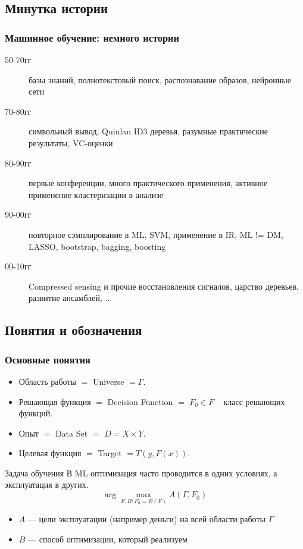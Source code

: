 \documentclass[14pt, fleqn, xcolor={dvipsnames, table}]{beamer}
\begin{document}
\subsection{Минутка истории}
\begin{frame}
\frametitle{Машинное обучение: немного истории}
\begin{small}
\begin{description}
	\item[50-70гг] базы знаний, полнотекстовый поиск, распознавание образов, нейронные сети
	\item[70-80гг] символьный вывод, Quinlan ID3 деревья, разумные практические результаты, VC-оценки
	\item[80-90гг] первые конференции, много практического применения, активное применение кластеризации в анализе
	\item[90-00гг] повторное сэмплирование в ML, SVM, применение в IR, ML != DM, LASSO, bootstrap, bagging, boosting
	\item[00-10гг] Compressed sensing и прочие восстановления сигналов, царство деревьев, развитие ансамблей, $\ldots$
\end{description}
\end{small}
\end{frame}

\subsection{Понятия и обозначения}
\begin{frame}
\frametitle{Основные понятия}
\begin{itemize}
	\item Область работы $=$ Universe $=\Gamma$.
	\item Решающая функция $=$ Decision Function $=$ $F_0 \in F$ -- класс решающих функций.
	\item Опыт $=$ Data Set $=$ $D = X \times Y$.
	\item Целевая функция $=$ Target $=T(y,F(x))$.
\end{itemize}
\end{frame}

\begin{frame}{Задача обучения}
В ML оптимизация часто проводится в одних условиях, а эксплуатация в других. 
$$
\arg \max_{F, B: F_0 = B(F)} A(\Gamma, F_0)
$$
\begin{itemize}
	\item $A$ --- цели эксплуатации (например деньги) на всей области работы $\Gamma$
	\item $B$ --- способ оптимизации, который реализуем
\end{itemize}
\end{frame}
\end{document}
